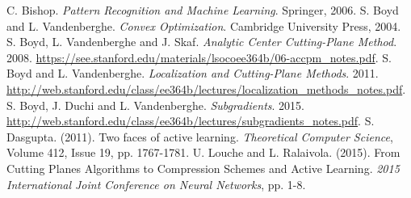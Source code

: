 \documentclass[11pt]{amsart}
\theoremstyle{definition}
\theoremstyle{remark}
\begin{document}
\renewcommand\refname{Bibliography}
\begin{thebibliography}{99}
     C. Bishop. \emph{Pattern Recognition and Machine Learning}. Springer, 2006.
     S. Boyd and L. Vandenberghe. \emph{Convex Optimization}. Cambridge University Press, 2004.
     S. Boyd, L. Vandenberghe and J. Skaf. \emph{Analytic Center Cutting-Plane Method}. 2008. \url{https://see.stanford.edu/materials/lsocoee364b/06-accpm_notes.pdf}.
     S. Boyd and L. Vandenberghe. \emph{Localization and Cutting-Plane Methods}. 2011. \url{http://web.stanford.edu/class/ee364b/lectures/localization_methods_notes.pdf}.
     S. Boyd, J. Duchi and L. Vandenberghe. \emph{Subgradients}. 2015. \url{http://web.stanford.edu/class/ee364b/lectures/subgradients_notes.pdf}.
     S. Dasgupta. (2011). Two faces of active learning. \emph{Theoretical Computer Science}, Volume 412, Issue 19, pp. 1767-1781.
     U. Louche and L. Ralaivola. (2015). From Cutting Planes Algorithms to Compression Schemes and Active Learning. \emph{2015 International Joint Conference on Neural Networks}, pp. 1-8.  
\end{thebibliography}




\end{document}
